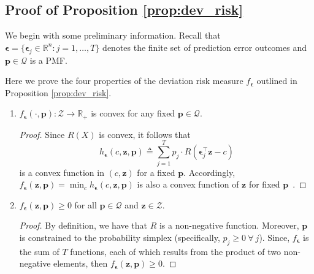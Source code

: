 \documentclass[10pt, twocolumn]{article}
\theoremstyle{plain}
\theoremstyle{definition}
\begin{document}
\begin{appendices}
\section{Proof of Proposition \ref{prop:dev_risk}}\label{app:dev_risk}

We begin with some preliminary information. Recall that \(\bm{\epsilon} = 
\{\bm{\epsilon}_j\in\mathbb{R}^n: j = 1, \ldots, T\}\) denotes the finite 
set of prediction error outcomes and \(\bm{p} \in \mathcal{Q}\) is a PMF.

Here we prove the four properties of the deviation risk measure 
\(f_{\bm{\epsilon}}\) outlined in Proposition \ref{prop:dev_risk}.

\begin{enumerate}[itemsep=-0.15em, topsep=0pt, leftmargin=*]

\item \(f_{\bm{\epsilon}}(\cdot, \bm{p}): \mathcal{Z} \rightarrow \mathbb{R}_+\) 
  is convex for any fixed \(\bm{p}\in\mathcal{Q}\).

  \begin{proof}
  Since \(R(X)\) is convex, it follows that 
  \begin{equation}
  \label{eq:h_ep}
	h_{\bm{\epsilon}}(c,\bm{z},\bm{p}) \triangleq \sum_{j=1}^T p_j\cdot R(\bm{\epsilon}_j^\top\bm{z} - c)
  \end{equation}
  is a convex function in \((c,\bm{z})\) for a fixed \(\bm{p}\). Accordingly,  
  \(f_{\bm{\epsilon}}(\bm{z}, \bm{p}) = \min_{c} h_{\bm{\epsilon}}(c,\bm{z},\bm{p})\) 
  is also a convex function of \(\bm{z}\) for fixed \(\bm{p}\)~\citep{boyd2004convex}. 
  \end{proof} 
	
  \item \(f_{\bm{\epsilon}}(\bm{z}, \bm{p})\geq 0\) for all 
    \(\bm{p}\in\mathcal{Q}\) and \(\bm{z}\in\mathcal{Z}\).
	
  \begin{proof} 
  By definition, we have that \(R\) is a non-negative function. Moreover, 
  \(\bm{p}\) is constrained to the probability simplex (specifically, 
  \(p_j\geq 0\ \forall\ j\)). Since, \(f_{\bm{\epsilon}}\) is the sum of
  \(T\) functions, each of which results from the product of two non-negative 
  elements, then \(f_{\bm{\epsilon}}(\bm{z}, \bm{p})\geq 0\). 
  \end{proof}
	

\end{enumerate}
\end{appendices}
\end{document}
